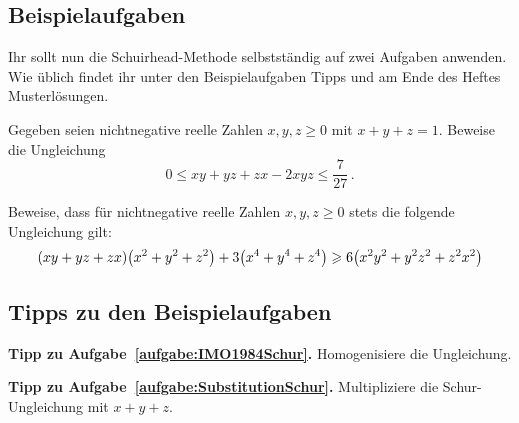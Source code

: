 \subsection*{Beispielaufgaben}
Ihr sollt nun die Schuirhead-Methode selbstständig auf zwei Aufgaben anwenden. Wie üblich findet ihr unter den Beispielaufgaben Tipps und am Ende des Heftes Musterlösungen.
\begin{aufgabe*}\label{aufgabe:IMO1984Schur}
	Gegeben seien nichtnegative reelle Zahlen $x,y,z\geqslant 0$ mit $x+y+z=1$. Beweise die Ungleichung
	\begin{equation*}
		0\leqslant xy+yz+zx-2xyz\leqslant\frac{7}{27}\,.
	\end{equation*}
\end{aufgabe*}
\begin{aufgabe*}\label{aufgabe:SubstitutionSchur}
	Beweise, dass für nichtnegative reelle Zahlen $x,y,z\geqslant 0$ stets die folgende Ungleichung gilt:
	\begin{equation*}
		(xy+yz+zx)\parens*{x^2+y^2+z^2}+3\parens*{x^4+y^4+z^4}\geqslant 6\parens*{x^2y^2+y^2z^2+z^2x^2}
	\end{equation*}
\end{aufgabe*}

\subsection*{Tipps zu den Beispielaufgaben}
\textbf{Tipp zu Aufgabe~\ref{aufgabe:IMO1984Schur}.} Homogenisiere die Ungleichung.

\textbf{Tipp zu Aufgabe~\ref{aufgabe:SubstitutionSchur}.} Multipliziere die Schur-Ungleichung mit $x+y+z$.